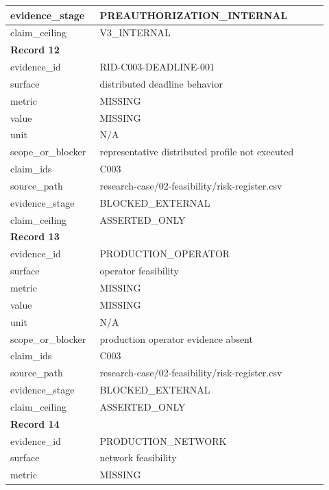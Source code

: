 \begin{longtable}{|p{0.24\linewidth}|p{0.68\linewidth}|}
evidence\_\allowbreak{}stage & PREAUTHORIZATION\_\allowbreak{}INTERNAL \\ \hline
claim\_\allowbreak{}ceiling & V3\_\allowbreak{}INTERNAL \\ \hline
\multicolumn{2}{|l|}{\textbf{Record 12}} \\ \hline
evidence\_\allowbreak{}id & RID-C003-DEADLINE-001 \\ \hline
surface & distributed deadline behavior \\ \hline
metric & MISSING \\ \hline
value & MISSING \\ \hline
unit & N/A \\ \hline
scope\_\allowbreak{}or\_\allowbreak{}blocker & representative distributed profile not executed \\ \hline
claim\_\allowbreak{}ids & C003 \\ \hline
source\_\allowbreak{}path & research-case/02-feasibility/risk-register.csv \\ \hline
evidence\_\allowbreak{}stage & BLOCKED\_\allowbreak{}EXTERNAL \\ \hline
claim\_\allowbreak{}ceiling & ASSERTED\_\allowbreak{}ONLY \\ \hline
\multicolumn{2}{|l|}{\textbf{Record 13}} \\ \hline
evidence\_\allowbreak{}id & PRODUCTION\_\allowbreak{}OPERATOR \\ \hline
surface & operator feasibility \\ \hline
metric & MISSING \\ \hline
value & MISSING \\ \hline
unit & N/A \\ \hline
scope\_\allowbreak{}or\_\allowbreak{}blocker & production operator evidence absent \\ \hline
claim\_\allowbreak{}ids & C003 \\ \hline
source\_\allowbreak{}path & research-case/02-feasibility/risk-register.csv \\ \hline
evidence\_\allowbreak{}stage & BLOCKED\_\allowbreak{}EXTERNAL \\ \hline
claim\_\allowbreak{}ceiling & ASSERTED\_\allowbreak{}ONLY \\ \hline
\multicolumn{2}{|l|}{\textbf{Record 14}} \\ \hline
evidence\_\allowbreak{}id & PRODUCTION\_\allowbreak{}NETWORK \\ \hline
surface & network feasibility \\ \hline
metric & MISSING \\ \hline

\end{longtable}
